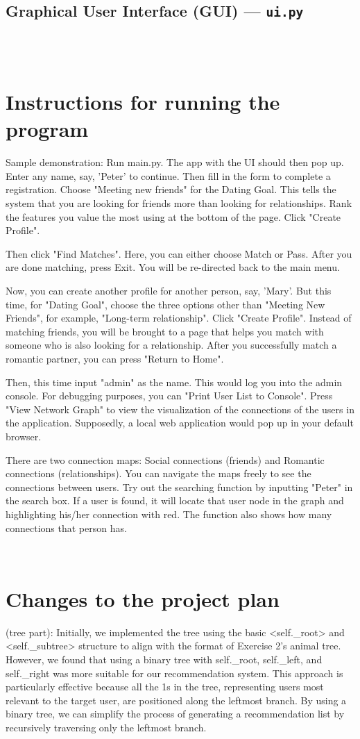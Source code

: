 \documentclass[fontsize=11pt]{article}
\begin{document}
\subsection*{Graphical User Interface (GUI) --- \texttt{ui.py}}
\\

\\
\section{Instructions for running the program}
Sample demonstration: Run main.py. The app with the UI should then pop up. Enter any name, say, 'Peter' to continue. Then fill in the form to complete a registration. Choose "Meeting new friends" for the Dating Goal. This tells the system that you are looking for friends more than looking for relationships. Rank the features you value the most using at the bottom of the page. Click "Create Profile".

Then click "Find Matches". Here, you can either choose Match or Pass. After you are done matching, press Exit. You will be re-directed back to the main menu.

Now, you can create another profile for another person, say, 'Mary'. But this time, for "Dating Goal", choose the three options other than "Meeting New Friends", for example, "Long-term relationship". Click "Create Profile". Instead of matching friends, you will be brought to a page that helps you match with someone who is also looking for a relationship. After you successfully match a romantic partner, you can press "Return to Home".

Then, this time input "admin" as the name. This would log you into the admin console. For debugging purposes, you can "Print User List to Console". Press "View Network Graph" to view the visualization of the connections of the users in the application. Supposedly, a local web application would pop up in your default browser.

There are two connection maps: Social connections (friends) and Romantic connections (relationships). You can navigate the maps freely to see the connections between users. Try out the searching function by inputting "Peter" in the search box. If a user is found, it will locate that user node in the graph and highlighting his/her connection with red. The function also shows how many connections that person has.


\\
\section{Changes to the project plan}
(tree part): Initially, we implemented the tree using the basic <self.\_root> and <self.\_subtree> structure to align with the format of Exercise 2's animal tree. However, we found that using a binary tree with self.\_root, self.\_left, and self.\_right was more suitable for our recommendation system. This approach is particularly effective because all the 1s in the tree, representing users most relevant to the target user, are positioned along the leftmost branch. By using a binary tree, we can simplify the process of generating a recommendation list by recursively traversing only the leftmost branch.
\end{document}
